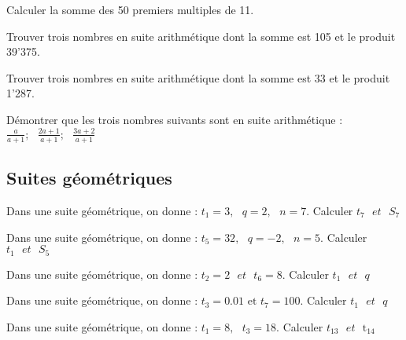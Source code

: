 \begin{exercice}
Calculer la somme des 50 premiers multiples de 11.
\end{exercice}

\begin{exercice}
Trouver trois nombres en suite arithmétique dont la somme est 105 et le produit 39'375.
\end{exercice}

\begin{exercice}
Trouver trois nombres en suite arithmétique dont la somme est 33 et le produit 1'287.
\end{exercice}

\begin{exercice}
Démontrer que les trois nombres suivants sont en suite arithmétique :  $\frac{a}{a+1};\text{  }\frac{2a+1}{a+1};\text{  }\frac{3a+2}{a+1}$
 \end{exercice}
 
\subsection{Suites géométriques}

\begin{exercice}
Dans une suite géométrique, on donne : ${{t}_{1}}=3,\text{ }q=2,\text{ }n=7$. Calculer ${{t}_{7}}\text{ }et\text{ }{{S}_{7}}$
\end{exercice}

\begin{exercice}
Dans une suite géométrique, on donne : ${{t}_{5}}=32,\text{ }q=-2,\text{ }n=5$. Calculer ${{t}_{1}}\text{ }et\text{ }{{S}_{5}}$
\end{exercice}

\begin{exercice}
Dans une suite géométrique, on donne : ${{t}_{2}}=2\text{ }et\text{ }{{t}_{6}}=8$. Calculer ${{t}_{1}}\text{ }et\text{ }q$
\end{exercice}

\begin{exercice}
Dans une suite géométrique, on donne : ${{t}_{3}}=0.01\text{ et }{{t}_{7}}=100$. Calculer ${{t}_{1}}\text{ }et\text{ }q$
\end{exercice}

\begin{exercice}
Dans une suite géométrique, on donne : ${{t}_{1}}=8,\text{ }{{t}_{3}}=18$. Calculer ${{t}_{13}}\text{ }et\text{ }{{\text{t}}_{\text{14}}}$
\end{exercice}

